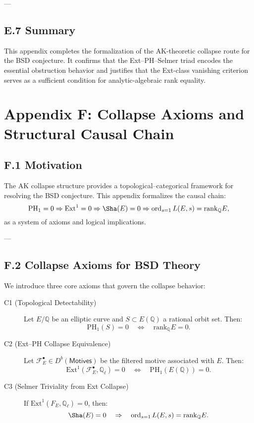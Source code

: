 \documentclass[11pt]{article}
\theoremstyle{definition}
\begin{document}
---

\subsection*{E.7 Summary}

This appendix completes the formalization of the AK-theoretic collapse route for the BSD conjecture.  
It confirms that the Ext--PH--Selmer triad encodes the essential obstruction behavior and justifies  
that the Ext-class vanishing criterion serves as a sufficient condition for analytic-algebraic rank equality.



\section*{Appendix F: Collapse Axioms and Structural Causal Chain}

\subsection*{F.1 Motivation}

The AK collapse structure provides a topological–categorical framework for resolving the BSD conjecture.  
This appendix formalizes the causal chain:
\[
\mathrm{PH}_1 = 0 \Rightarrow \mathrm{Ext}^1 = 0 \Rightarrow \Sha(E) = 0 \Rightarrow \operatorname{ord}_{s=1}L(E,s) = \mathrm{rank}_{\mathbb{Q}}E,
\]
as a system of axioms and logical implications.

---

\subsection*{F.2 Collapse Axioms for BSD Theory}

We introduce three core axioms that govern the collapse behavior:

\begin{description}
  \item[C1 (Topological Detectability)]  
  Let \( E/\mathbb{Q} \) be an elliptic curve and \( S \subset E(\mathbb{Q}) \) a rational orbit set.  
  Then:
  \[
  \mathrm{PH}_1(S) = 0 \quad \Leftrightarrow \quad \mathrm{rank}_{\mathbb{Q}}E = 0.
  \]

  \item[C2 (Ext–PH Collapse Equivalence)]  
  Let \( \mathcal{F}_E^\bullet \in D^b(\mathsf{Motives}) \) be the filtered motive associated with \( E \).  
  Then:
  \[
  \mathrm{Ext}^1(\mathcal{F}_E^\bullet, \mathbb{Q}_\ell) = 0 \quad \Leftrightarrow \quad \mathrm{PH}_1(E(\mathbb{Q})) = 0.
  \]

  \item[C3 (Selmer Triviality from Ext Collapse)]  
  If \( \mathrm{Ext}^1(F_E, \mathbb{Q}_\ell) = 0 \), then:
  \[
  \Sha(E) = 0 \quad \Rightarrow \quad \operatorname{ord}_{s=1}L(E,s) = \mathrm{rank}_{\mathbb{Q}}E.
  \]
\end{description}
\end{document}
